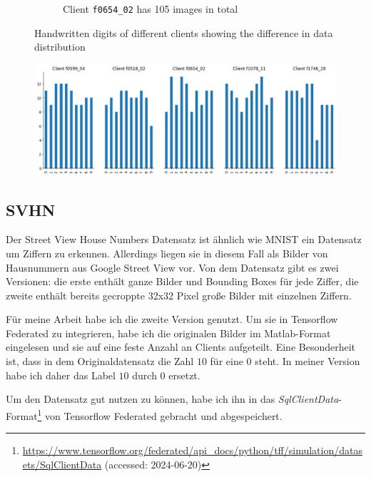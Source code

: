 \begin{figure}[tb]
\begin{subfigure}{0.4\textwidth}
        \caption{Client \texttt{f0654\_02} has 105 images in total}
    \end{subfigure}
    	\caption{Handwritten digits of different clients showing the difference in data distribution}
    \label{fig:mnist-digits}
\end{figure}

\begin{figure}[tb]
	\centering
	\includegraphics[width=\textwidth]{Bilder/emnist_client_label_distribution.png}
	\caption{}
	\label{fig:emnist-client-label-dist}
\end{figure}

\subsection{SVHN}

Der Street View House Numbers Datensatz \parencite{netzer:2011} ist ähnlich wie MNIST ein Datensatz um Ziffern zu erkennen. Allerdings liegen sie in diesem Fall als Bilder von Hausnummern aus Google Street View vor. Von dem Datensatz gibt es zwei Versionen: die erste enthält ganze Bilder und Bounding Boxes für jede Ziffer, die zweite enthält bereits gecroppte 32x32 Pixel große Bilder mit einzelnen Ziffern.

Für meine Arbeit habe ich die zweite Version genutzt. Um sie in Tensorflow Federated zu integrieren, habe ich die originalen Bilder im Matlab-Format eingelesen und sie auf eine feste Anzahl an Clients aufgeteilt. Eine Besonderheit ist, dass in dem Originaldatensatz die Zahl $10$ für eine $0$ steht. In meiner Version habe ich daher das Label $10$ durch $0$ ersetzt.

Um den Datensatz gut nutzen zu können, habe ich ihn in das \textit{SqlClientData}-Format\footnote{\url{https://www.tensorflow.org/federated/api_docs/python/tff/simulation/datasets/SqlClientData} (accessed: 2024-06-20)} von Tensorflow Federated gebracht und abgespeichert.

